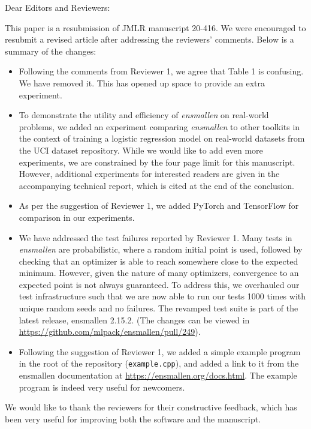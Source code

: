 \documentclass[twoside,11pt]{article}
\begin{document}
\noindent Dear Editors and Reviewers: \\

\medskip

\noindent This paper is a resubmission of JMLR manuscript 20-416.  We were
encouraged to resubmit a revised article after addressing the reviewers' comments.
Below is a summary of the changes:

\begin{itemize}
  \item Following the comments from Reviewer 1, we agree that Table 1 is
confusing. We have removed it.  This has opened up space to provide an extra experiment.

  \item To demonstrate the utility and efficiency of {\it ensmallen} on real-world
problems, we added an experiment comparing {\it ensmallen} to other toolkits in the context of training 
a logistic regression model on real-world datasets from the UCI dataset
repository.  While we would like to add even more experiments,
we are constrained by the four page limit for this manuscript.
However, additional experiments for interested readers are given
in the accompanying technical report, which is cited at the end of the conclusion.

  \item As per the suggestion of Reviewer 1, we added PyTorch and TensorFlow
  for comparison in our experiments.

  \item We have addressed the test failures reported by Reviewer 1.
Many tests in {\it ensmallen} are probabilistic, where a random initial point is used,
followed by checking that an optimizer is able to reach somewhere
close to the expected minimum.  However, given the nature of many optimizers,
convergence to an expected point is not always guaranteed.
To address this, we overhauled our test infrastructure such that we are now able
to run our tests 1000 times with unique random seeds and no failures.
The revamped test suite is part of the latest release, ensmallen 2.15.2.
(The changes can be viewed in \url{https://github.com/mlpack/ensmallen/pull/249}).  

  \item Following the suggestion of Reviewer 1, we added a simple example program
in the root of the repository ({\tt example.cpp}), and added a link to it from the
ensmallen documentation at \url{https://ensmallen.org/docs.html}.
The example program is indeed very useful for newcomers.
\end{itemize}

\noindent We would like to thank the reviewers for their constructive feedback,
which has been very useful for improving both the software and the manuscript.
\end{document}
